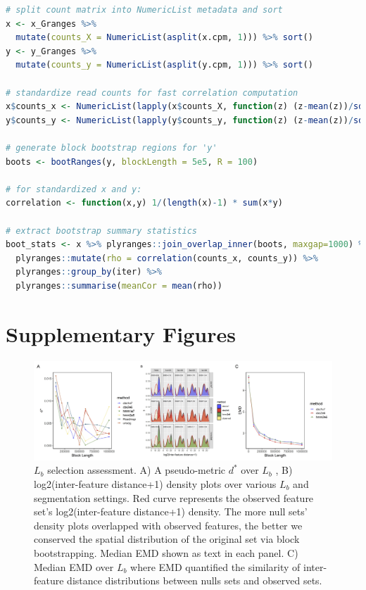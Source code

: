 \documentclass{article}
\begin{document}
\begin{lstlisting}[language=R]
# split count matrix into NumericList metadata and sort
x <- x_Granges %>%
  mutate(counts_X = NumericList(asplit(x.cpm, 1))) %>% sort()
y <- y_Granges %>%
  mutate(counts_y = NumericList(asplit(y.cpm, 1))) %>% sort()

# standardize read counts for fast correlation computation
x$counts_x <- NumericList(lapply(x$counts_X, function(z) (z-mean(z))/sd(z)))
y$counts_y <- NumericList(lapply(y$counts_y, function(z) (z-mean(z))/sd(z)))

# generate block bootstrap regions for 'y'
boots <- bootRanges(y, blockLength = 5e5, R = 100)

# for standardized x and y:
correlation <- function(x,y) 1/(length(x)-1) * sum(x*y)

# extract bootstrap summary statistics
boot_stats <- x %>% plyranges::join_overlap_inner(boots, maxgap=1000) %>%
  plyranges::mutate(rho = correlation(counts_x, counts_y)) %>%
  plyranges::group_by(iter) %>%
  plyranges::summarise(meanCor = mean(rho)) 
\end{lstlisting} 
 
\newpage

\section{Supplementary Figures}

\begin{figure}[htbp]
\centering
\includegraphics[scale=0.35]{Figures/sfig1.jpeg}
\caption{$L_b$ selection assessment. A) A pseudo-metric $d^*$
  \citep{bickel2010subsampling} over $L_b$ , B) 
  log2(inter-feature distance+1) density plots over various $L_b$ and
  segmentation settings. Red curve represents the observed
   feature set's
  log2(inter-feature distance+1) density. The more 
  null sets' density
  plots overlapped with observed features, the better we conserved the
  spatial distribution of the original set via block
  bootstrapping. Median EMD shown as text in each panel. C) Median
  EMD over $L_b$ where EMD quantified the similarity of inter-feature
  distance distributions between  nulls sets and observed sets.}
\label{fig:suppfig0}
\end{figure}
\end{document}
